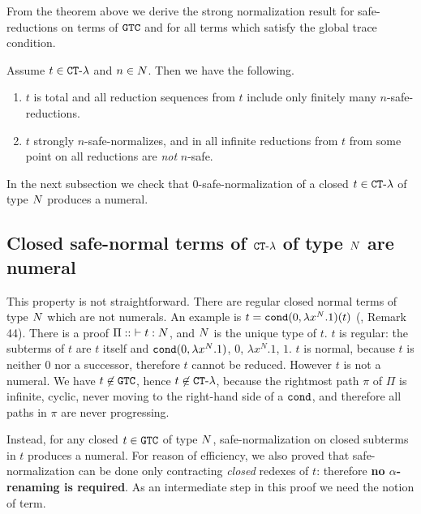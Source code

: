 

From the theorem above we derive the strong normalization result 
for safe-reductions on terms of ${\tt GTC}$
and for all terms which satisfy the global trace condition.

\begin{corollary}\label{cor:SN_GTC}
\label{corollary-finite-safe-reduction}
  Assume  $t \in { {\tt CT}\mbox{-}\lambda}$ and $n \in {N}$. Then we have the following. 
  \begin {enumerate}
  \item
    $t$ is total and all reduction sequences
    from $t$ include only finitely many $n$-safe-reductions.
  \item
    $t$ strongly $n$-safe-normalizes, and in all infinite reductions from $t$
    from some point on all reductions are \emph{not} $n$-safe.
   \end{enumerate}

\end{corollary}

In the next subsection we check that $0$-safe-normalization of a closed $t \in { {\tt CT}\mbox{-}\lambda}$
of type ${N}$ produces a numeral.


\subsection{Closed safe-normal terms of ${ {\tt CT}\mbox{-}\lambda}$ of type ${N}$ are numeral}
This property is not straightforward. 
There are regular closed normal terms of type ${N}$ which are not numerals.
An example is $t = {\tt cond}(0, \lambda x^N.1)(t)$ 
(\cite{2021-Anupam-Das}, Remark 44). 
There is a proof $\Pi::\ \vdash t: {N}$, and ${N}$ is the unique type of $t$. 
$t$ is regular: the subterms of $t$ are
$t$ itself and ${\tt cond}(0, \lambda x^N.1)$, $0$, $\lambda x^N.1$, $1$.
$t$ is normal, because $t$ is neither $0$ nor a successor, 
therefore $t$ cannot be reduced. However $t$ is not a numeral.
We have $t \not \in {\tt GTC}$, hence $t \not \in { {\tt CT}\mbox{-}\lambda}$, because
the rightmost path $\pi$ of $\Pi$ is infinite, cyclic, 
never moving to the right-hand side of a ${\tt cond}$,
and therefore all paths in $\pi$ are never progressing.

Instead, for any closed $t \in {\tt GTC}$ of type ${N}$, safe-normalization on closed subterms in $t$
produces a numeral. For reason of efficiency,
we also proved that safe-normalization can be done only contracting 
\emph{closed} redexes of $t$: therefore {\bf no $\alpha$-renaming is required}.
As an intermediate step in this proof we need the notion of 
 term.

